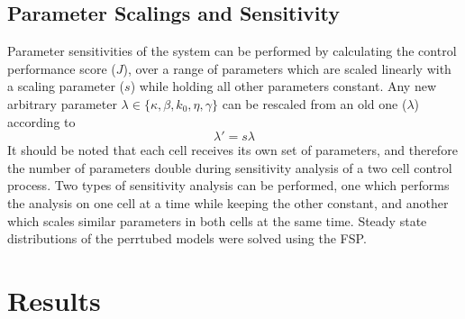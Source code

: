 \documentclass[12pt]{article}
\begin{document}
\subsection{Parameter Scalings and Sensitivity}
Parameter sensitivities of the system can be performed by calculating the control performance score ($J$), over a range of parameters which are scaled linearly with a scaling parameter ($s$) while holding all other parameters constant. Any new arbitrary parameter $\lambda\in \{ \kappa,\beta,k_0,\eta,\gamma\}$ can be rescaled from an old one ($\lambda$) according to
\begin{equation}
\lambda' = s \lambda
\end{equation}
It should be noted that each cell receives its own set of parameters, and therefore the number of parameters double during sensitivity analysis of a two cell control process. Two types of sensitivity analysis can be performed, one which performs the analysis on one cell at a time while keeping the other constant, and another which scales similar parameters in both cells at the same time. Steady state distributions of the perrtubed models were solved using the FSP.
\section{Results}
\end{document}
